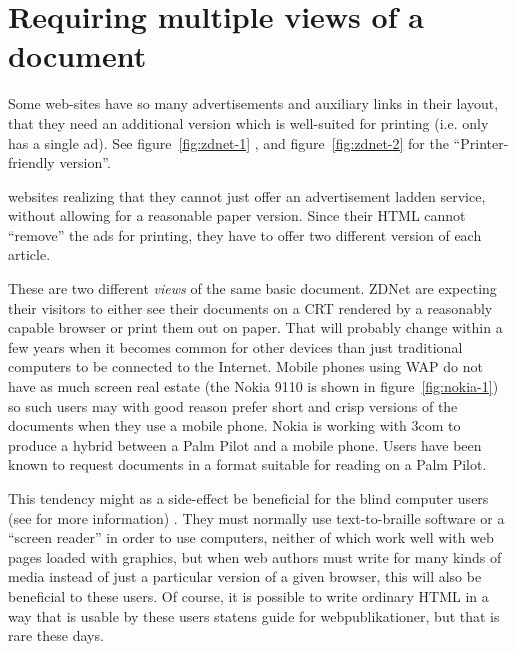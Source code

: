 \section{Requiring multiple views of a document}
\label{sec:requiring-multiple-views-of-a-document}


Some web-sites have so many advertisements and auxiliary links in
their layout, that they need an additional version which is
well-suited for printing (i.e. only has a single ad).  See
figure~\vref{fig:zdnet-1}
, and figure~\vref{fig:zdnet-2} for the
``Printer-friendly version''.

\textsf{websites realizing that they cannot just offer an
  advertisement ladden service, without allowing for a reasonable
  paper version.  Since their HTML cannot ``remove'' the ads for
  printing, they have to offer two different version of each article.}


These are two different \textit{views} of the same basic document.
ZDNet are expecting their visitors to either see their documents on a
CRT rendered by a reasonably capable browser or print them out on
paper.  That will probably change within a few years when it becomes
common for other devices than just traditional computers to be
connected to the Internet.  Mobile phones using WAP do not have as
much screen real estate (the Nokia 9110 is shown in
figure~\vref{fig:nokia-1}) so such users may with good reason prefer
short and crisp versions of the documents when they use a mobile
phone.  Nokia is working with 3com to produce a hybrid between a Palm
Pilot and a mobile phone.  Users have been known to request documents
in a format suitable for reading on a Palm Pilot.  

This tendency might as a side-effect be beneficial for the blind
computer users (see
 for more information) .  They must normally use
text-to-braille software or a ``screen reader'' in order to use
computers, neither of which work well with web pages loaded with
graphics, but when web authors must write for many kinds of media
instead of just a particular version of a given browser, this will
also be beneficial to these users.  Of course, it is possible to write
ordinary HTML in a way that is usable by these users \textsf{statens
  guide for webpublikationer}, but that is rare these days.


